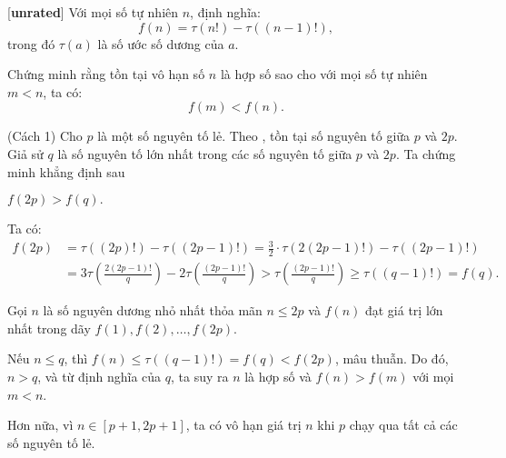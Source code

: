 \documentclass[../03-arithmetic-functions.tex]{subfiles}
\begin{document}
\begin{example*}\label{example:CHN-2015-TST3-D2-P3}[\textbf{unrated}]
	Với mọi số tự nhiên \( n \), định nghĩa:
	\[
		f(n) = \tau(n!) - \tau((n-1)!),
	\]
	trong đó \( \tau(a) \) là số ước số dương của \( a \).  
	
	Chứng minh rằng tồn tại vô hạn số \( n \) là hợp số sao cho với mọi số tự nhiên \( m < n \), ta có:
	\[
		f(m) < f(n).
	\]
\end{example*}

\begin{soln}(Cách 1)\footnotemark
	Cho \( p \) là một số nguyên tố lẻ. Theo , tồn tại số nguyên tố giữa $p$ và $2p$.
	Giả sử $q$ là số nguyên tố lớn nhất trong các số nguyên tố giữa $p$ và $2p$.
	Ta chứng minh khẳng định sau
	\begin{claim*}
		$f(2p) > f(q).$
	\end{claim*}
	\begin{subproof}
		Ta có:
		\[
			\begin{aligned} 
				f(2p) &= \tau((2p)!) - \tau((2p-1)!) = \frac{3}{2} \cdot \tau(2(2p-1)!) - \tau((2p-1)!) \\ 
			 	&= 3\tau\left(\frac{2(2p-1)!}{q}\right) - 2\tau\left(\frac{(2p-1)!}{q}\right) 
			  	> \tau\left(\frac{(2p-1)!}{q}\right) \geq \tau((q-1)!) = f(q).	
			\end{aligned}
		\]
	\end{subproof}

	Gọi \( n \) là số nguyên dương nhỏ nhất thỏa mãn \( n \leq 2p \) và \( f(n) \) đạt giá trị lớn nhất trong dãy \( f(1), f(2), \dots, f(2p) \).  
			
	Nếu \( n \leq q \), thì \( f(n) \leq \tau((q-1)!) = f(q) < f(2p) \), mâu thuẫn.  
	Do đó, \( n > q \), và từ định nghĩa của \( q \), ta suy ra \( n \) là hợp số và $ f(n)>f(m) $ với mọi $ m<n $. 
	
	Hơn nữa, vì \( n \in [p+1, 2p+1] \), ta có vô hạn giá trị \( n \) khi \( p \) chạy qua tất cả các số nguyên tố lẻ.
\end{soln}

\end{document}
